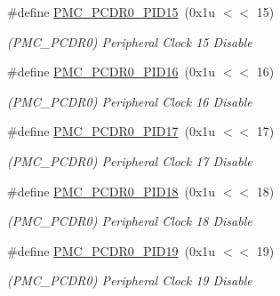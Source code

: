 \begin{DoxyCompactItemize}
\mbox{\label{group__SAMS70__PMC_gae7739b10f4ea282433695fdcdcfefd2f}} 
\#define \mbox{\hyperlink{group__SAMS70__PMC_gae7739b10f4ea282433695fdcdcfefd2f}{P\+M\+C\+\_\+\+P\+C\+D\+R0\+\_\+\+P\+I\+D15}}~(0x1u $<$$<$ 15)
\begin{DoxyCompactList}\small\item\em (P\+M\+C\+\_\+\+P\+C\+D\+R0) Peripheral Clock 15 Disable \end{DoxyCompactList}\item 
\mbox{\label{group__SAMS70__PMC_ga1eed6205a0bc82ecfe67ebd13b87aef6}} 
\#define \mbox{\hyperlink{group__SAMS70__PMC_ga1eed6205a0bc82ecfe67ebd13b87aef6}{P\+M\+C\+\_\+\+P\+C\+D\+R0\+\_\+\+P\+I\+D16}}~(0x1u $<$$<$ 16)
\begin{DoxyCompactList}\small\item\em (P\+M\+C\+\_\+\+P\+C\+D\+R0) Peripheral Clock 16 Disable \end{DoxyCompactList}\item 
\mbox{\label{group__SAMS70__PMC_ga974498919696992853b770e0964d67a1}} 
\#define \mbox{\hyperlink{group__SAMS70__PMC_ga974498919696992853b770e0964d67a1}{P\+M\+C\+\_\+\+P\+C\+D\+R0\+\_\+\+P\+I\+D17}}~(0x1u $<$$<$ 17)
\begin{DoxyCompactList}\small\item\em (P\+M\+C\+\_\+\+P\+C\+D\+R0) Peripheral Clock 17 Disable \end{DoxyCompactList}\item 
\mbox{\label{group__SAMS70__PMC_ga814f727de74d228f9867629151bed75b}} 
\#define \mbox{\hyperlink{group__SAMS70__PMC_ga814f727de74d228f9867629151bed75b}{P\+M\+C\+\_\+\+P\+C\+D\+R0\+\_\+\+P\+I\+D18}}~(0x1u $<$$<$ 18)
\begin{DoxyCompactList}\small\item\em (P\+M\+C\+\_\+\+P\+C\+D\+R0) Peripheral Clock 18 Disable \end{DoxyCompactList}\item 
\mbox{\label{group__SAMS70__PMC_ga29a26637a1fdeebb00f4bcfa73b5febd}} 
\#define \mbox{\hyperlink{group__SAMS70__PMC_ga29a26637a1fdeebb00f4bcfa73b5febd}{P\+M\+C\+\_\+\+P\+C\+D\+R0\+\_\+\+P\+I\+D19}}~(0x1u $<$$<$ 19)
\begin{DoxyCompactList}\small\item\em (P\+M\+C\+\_\+\+P\+C\+D\+R0) Peripheral Clock 19 Disable \end{DoxyCompactList}\item 
$$
\end{DoxyCompactItemize}
